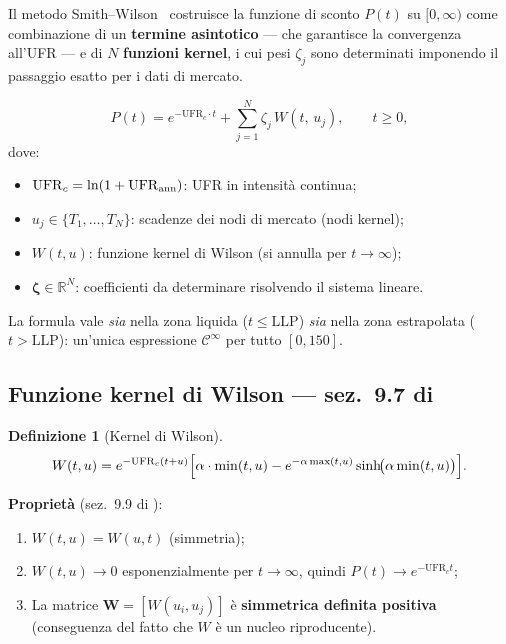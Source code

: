 \documentclass[11pt,a4paper]{article}
\theoremstyle{plain}
\theoremstyle{definition}
\newtheorem{definizione}[teorema]{Definizione}
\theoremstyle{remark}
\newcommand{\R}{\mathbb{R}}
\newcommand{\UFR}{\mathrm{UFR}}
\newcommand{\LLP}{\mathrm{LLP}}
\newcommand{\bfzeta}{\bm{\zeta}}
\newcommand{\Wmat}{\mathbf{W}}
\begin{document}
Il metodo Smith--Wilson~\cite{smithwilson2001} costruisce la funzione di sconto
$P(t)$ su $[0,\infty)$ come combinazione di un \textbf{termine asintotico} ---
che garantisce la convergenza all'UFR --- e di $N$ \textbf{funzioni kernel},
i cui pesi $\zeta_j$ sono determinati imponendo il passaggio esatto per i dati di mercato.

\begin{keybox}
\begin{equation}
  \label{eq:sw_main}
  P(t) = e^{-\UFR_c \cdot t} + \sum_{j=1}^{N}\zeta_j\,W(t,\,u_j),
  \qquad t \ge 0,
\end{equation}
dove:
\begin{itemize}
  \item $\UFR_c = \ln(1 + \UFR_{\rm ann})$: UFR in intensit\`a continua;
  \item $u_j \in \{T_1,\ldots,T_N\}$: scadenze dei nodi di mercato (nodi kernel);
  \item $W(t,u)$: funzione kernel di Wilson (si annulla per $t\to\infty$);
  \item $\bfzeta \in \R^N$: coefficienti da determinare risolvendo il sistema lineare.
\end{itemize}
\end{keybox}

La formula vale \emph{sia} nella zona liquida ($t \le \LLP$) \emph{sia} nella zona
estrapolata ($t > \LLP$): un'unica espressione $\mathcal{C}^\infty$ per tutto $[0, 150]$.

\subsection{Funzione kernel di Wilson --- sez.~9.7 di \cite{eiopa2025}}

\begin{definizione}[Kernel di Wilson]
\begin{equation}
  \label{eq:kernel}
  W(t,u) = e^{-\UFR_c(t+u)}\Bigl[
    \alpha\cdot\min(t,u)
    - e^{-\alpha\max(t,u)}\sinh\!\bigl(\alpha\min(t,u)\bigr)
  \Bigr].
\end{equation}
\end{definizione}

\textbf{Propriet\`a} (sez.~9.9 di \cite{eiopa2025}):
\begin{enumerate}
  \item $W(t,u)=W(u,t)$ (simmetria);
  \item $W(t,u)\to 0$ esponenzialmente per $t\to\infty$, quindi $P(t)\to e^{-\UFR_c t}$;
  \item La matrice $\Wmat=[W(u_i,u_j)]$ \`e \textbf{simmetrica definita positiva}
        (conseguenza del fatto che $W$ \`e un nucleo riproducente).
\end{enumerate}
\end{document}
